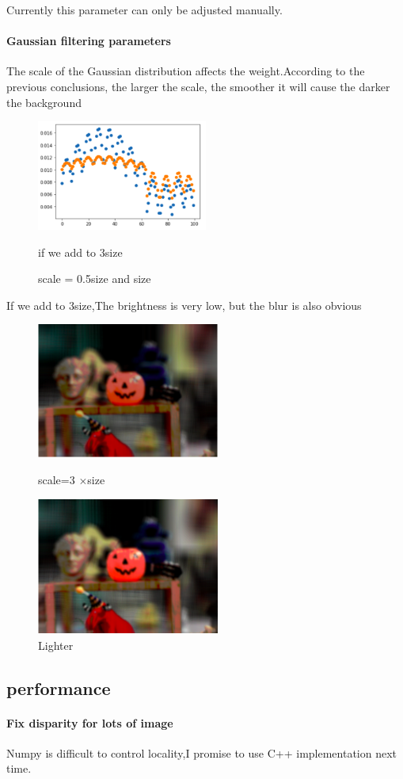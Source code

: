 \documentclass[letterpaper,12pt]{article}
\begin{document}
Currently this parameter can only be adjusted manually.
\paragraph{Gaussian filtering parameters}
The scale of the Gaussian distribution affects the weight.According to the previous conclusions, the larger the scale, the smoother it will cause the darker the background
\begin{figure}[h]
	\centering 
	\includegraphics[width=0.5\textwidth]{Image/smooth.png}
	\caption{scale = 0.5size and size}
if we add to 3size
\end{figure}
\newline
If we add to 3size,The brightness is very low, but the blur is also obvious
	\begin{figure}[htbp]
	\centering
	\begin{minipage}[t]{0.48\textwidth}
		\centering
		\includegraphics[width=6cm]{Image/3g.png}
		\caption{scale=3 $\times$size}
	\end{minipage}
	\begin{minipage}[t]{0.48\textwidth}
		\centering
		\includegraphics[width=6cm]{Image/3gl.png}
		\caption{Lighter}
	\end{minipage}
\end{figure}


\subsection{performance}
\paragraph{Fix disparity for lots of image}
Numpy is difficult to control locality,I promise to use C++ implementation next time.
\end{document}
